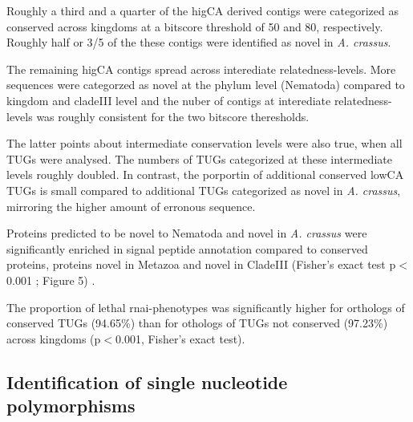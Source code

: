\documentclass[10pt]{bmc_article}
\newenvironment{bmcformat}{\begin{raggedright}\baselineskip20pt\sloppy\setboolean{publ}{false}}{\end{raggedright}\baselineskip20pt\sloppy}
\begin{document}
\begin{bmcformat}
Roughly a third and a quarter of the higCA derived contigs were
categorized as conserved across kingdoms at a bitscore threshold of 50
and 80, respectively. Roughly half or 3/5 of the these contigs were
identified as novel in \textit{A. crassus}.

The remaining higCA contigs spread across interediate
relatedness-levels. More sequences were categorzed as novel at the
phylum level (Nematoda) compared to kingdom and cladeIII level and the
nuber of contigs at interediate relatedness-levels was roughly
consistent for the two bitscore theresholds.

The latter points about intermediate conservation levels were also
true, when all TUGs were analysed. The numbers of TUGs categorized at
these intermediate levels roughly doubled. In contrast, the porportin
of additional conserved lowCA TUGs is small compared to additional
TUGs categorized as novel in \textit{A. crassus}, mirroring the higher
amount of erronous sequence.

Proteins predicted to be novel to Nematoda and novel in
\textit{A. crassus} were significantly enriched in signal peptide
annotation compared to conserved proteins, proteins novel in Metazoa
and novel in CladeIII (Fisher's exact test p$<$0.001 ; Figure 5) .

The proportion of lethal rnai-phenotypes was significantly higher for
orthologs of conserved TUGs
(94.65\%) than for othologs of
TUGs not conserved (97.23\%) across
kingdoms (p$<$0.001, Fisher's exact test).

\subsection*{Identification of single nucleotide polymorphisms}


\end{bmcformat}
\end{document}
